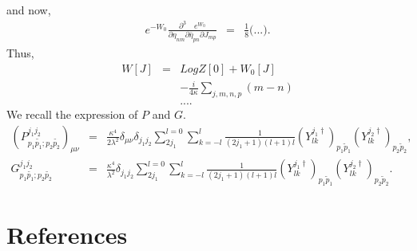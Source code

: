\documentclass[a4paper,11pt]{article} %
\numberwithin{equation}{section} %
\numberwithin{figure}{section} %
\theoremstyle{plain} %
\theoremstyle{definition} %
\theoremstyle{remark} %
\begin{document}
and now,
\begin{eqnarray*}
 e^{-W_{0}} \frac{\partial^{3} \quad e^{W_{0}}}{\partial \eta_{n m} \partial \bar{\eta}_{pn} \partial J_{mp}} &=&  \frac{1}{8}
 \Bigg( ... \Bigg).
\end{eqnarray*}
Thus,
\begin{eqnarray*}
 W[J] &=& Log Z[0] + W_{0}[J] \\
      && -  \frac{i}{4 \kappa} \sum_{j, m, n, p} (m-n) \\
      && ... .
\end{eqnarray*}
We recall the expression of $P$ and $G$.
\begin{eqnarray*}
 (P^{j_1 j_2 }_{p_1 \tilde{p_1} ; p_2 \tilde{p_2} })_{\mu \nu} &=& \frac{\kappa^4}{2 \lambda^2} \delta_{\mu \nu} \delta_{j_1 j_2}  \sum_{2 j_1}^{l=0} \sum_{k=-l}^{l} \frac{1}{(2j_1 + 1)(l+1)l} (Y^{j_1 \dagger}_{l k})_{p_1 \tilde{p}_1 } (Y^{j_2 \dagger}_{l k})_{p_2 \tilde{p}_2 } ,\\
 G^{j_1 j_2 }_{p_1 \tilde{p_1} ; p_2 \tilde{p_2} }             &=& \frac{\kappa^4}{\lambda^2} \delta_{j_1 j_2} \sum_{2 j_1}^{l=0} \sum_{k=-l}^{l} \frac{1}{(2 j_1 + 1)(l+1)l} (Y^{j_1 \dagger}_{l k})_{p_1 \tilde{p}_1 } (Y^{j_2 \dagger}_{l k})_{p_2 \tilde{p}_2 }.
\end{eqnarray*}

\section{References}

\renewcommand{\section}[2]{}
 

%
%

%
%
%
%
%
\end{document}
